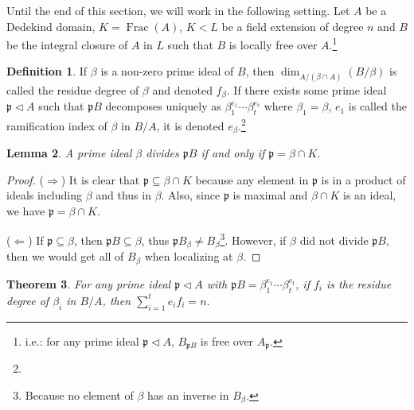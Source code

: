 \documentclass{tufte-handout} %
\newtheorem{thm}{Theorem}
\newtheorem{lem}[thm]{Lemma}
\theoremstyle{definition}
\newtheorem{defn}[thm]{Definition}
\theoremstyle{remark}
\newcommand{\lp}{{\mathfrak{p}}}
\DeclareMathOperator{\ff}{Frac}
\begin{document}
Until the end of this section, we will work in the following setting. Let $A$ be a Dedekind domain, $K = \ff(A)$, $K < L$ be a field extension of degree $n$ and $B$ be the integral closure of $A$ in $L$ such that $B$ is locally free over $A$.\footnote{i.e.: for any prime ideal $\lp \lhd A$, $B_{\lp B}$ is free over $A_{\lp}$.}
\begin{defn}
	If $\beta$ is a non-zero prime ideal of $B$, then $\dim_{A/(\beta \cap A)}(B/\beta)$ is called the residue degree of $\beta$ and denoted $f_{\beta}$. If there exists some prime ideal $\lp \lhd A$ such that $\lp B$ decomposes uniquely as $\beta_1^{e_1}\cdots \beta_t^{e_t}$ where $\beta_1 = \beta$, $e_1$ is called the ramification index of $\beta$ in $B/A$, it is denoted $e_{\beta}$.\footnote{%
	}
\end{defn}
\begin{lem}\label{lem3.33}
	A prime ideal $\beta$ divides $\lp B$ if and only if $\lp = \beta\cap K$.
\end{lem}
\begin{proof}
	($\Rightarrow$) It is clear that $\lp \subseteq \beta \cap K$ because any element in $\lp$ is in a product of ideals including $\beta$ and thus in $\beta$. Also, since $\lp$ is maximal and $\beta \cap K$ is an ideal, we have $\lp = \beta \cap K$.
	
	($\Leftarrow$) If $\lp \subseteq \beta$, then $\lp B \subseteq \beta$, thus $\lp B_{\beta} \neq B_{\beta}$\footnote{Because no element of $\beta$ has an inverse in $B_{\beta}$.}. However, if $\beta$ did not divide $\lp B$, then we would get all of $B_{\beta}$ when localizing at $\beta$.
\end{proof}
\begin{thm}
For any prime ideal $\lp \lhd A$ with $\lp B = \beta_1^{e_1}\cdots \beta_t^{e_t}$, if $f_i$ is the residue degree of $\beta_i$ in $B/A$, then $\sum_{i=1}^t e_if_i = n$.
\end{thm}
\end{document}
